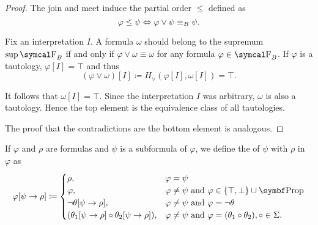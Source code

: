 \begin{proof}
  The join and meet induce the partial order \( \leq \) defined as
  \begin{equation*}
    \varphi \leq \psi \Leftrightarrow \varphi \vee \psi \equiv_B \psi.
  \end{equation*}

   Fix an interpretation \( I \). A formula \( \omega \) should belong to the supremum \( \sup \CF_B \) if and only if \( \varphi \vee \omega \equiv \omega \) for any formula \( \varphi \in \CF_B \). If \( \varphi \) is a tautology, \( \varphi[I] = \top \) and thus
  \begin{equation*}
    (\varphi \vee \omega)[I] \coloneqq H_\vee(\varphi[I], \omega[I]) = \top.
  \end{equation*}

  It follows that \( \omega[I] = \top \). Since the interpretation \( I \) was arbitrary, \( \omega \) is also a tautology. Hence the top element is the equivalence class of all tautologies.

   The proof that the contradictions are the bottom element is analogous.
\end{proof}

\begin{definition}\label{def:propositional_substition}
  If \( \varphi \) and \( \rho \) are formulas and \( \psi \) is a subformula of \( \varphi \), we define the  of \( \psi \) with \( \rho \) in \( \varphi \) as
  \begin{equation*}
    \varphi[\psi \to \rho] \coloneqq \begin{cases}
      \rho,                                                    &\varphi = \psi                                                                        \\
      \varphi,                                                 &\varphi \neq \psi \text{ and } \varphi \in \{ \top, \bot \} \cup \Bold{Prop}          \\
      \neg \theta[\psi \to \rho],                              &\varphi \neq \psi \text{ and } \varphi = \neg \theta                                  \\
      (\theta_1[\psi \to \rho] \circ \theta_2[\psi \to \rho]), &\varphi \neq \psi \text{ and } \varphi = (\theta_1 \circ \theta_2), \circ \in \Sigma.
    \end{cases}
  \end{equation*}
\end{definition}

